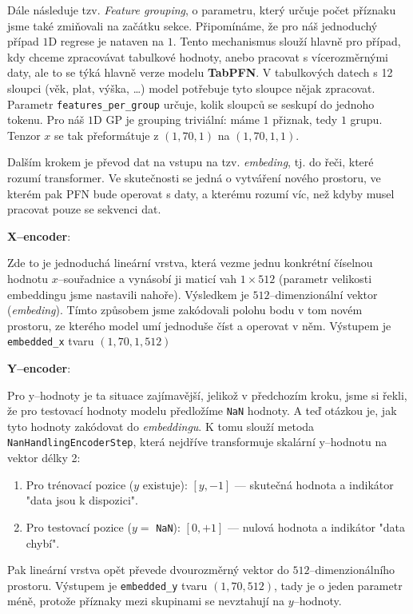 Dále následuje tzv. \textit{Feature grouping}, o parametru, který určuje počet příznaku jsme také zmiňovali na začátku sekce.
Připomínáme, že pro náš jednoduchý případ $1$D regrese je nataven na $1$.
Tento mechanismus slouží hlavně pro případ, kdy chceme zpracovávat tabulkové hodnoty, anebo pracovat s vícerozměrnými daty, ale to se týká hlavně verze modelu \textbf{TabPFN}.
V tabulkových datech s 12 sloupci (věk, plat, výška, \dots) model potřebuje tyto sloupce nějak zpracovat. 
Parametr \texttt{features\_per\_group} určuje, kolik sloupců se seskupí do jednoho tokenu.
Pro náš $1$D GP je grouping triviální: máme $1$ přiznak, tedy $1$ grupu. 
Tenzor $x$ se tak přeformátuje z $(1, 70, 1)$ na $(1, 70, 1, 1)$.
\par   

Dalším krokem je převod dat na vstupu na tzv. \textit{embeding}, tj. do řeči, které rozumí transformer. 
Ve skutečnosti se jedná o vytváření nového prostoru, ve kterém pak PFN bude operovat s daty, a kterému rozumí víc, než kdyby musel pracovat pouze se sekvenci dat.


\textbf{X–encoder}:

Zde to je jednoduchá lineární vrstva, která vezme jednu konkrétní číselnou hodnotu $x$–souřadnice a vynásobí ji maticí vah $1\times512$ (parametr velikosti embeddingu jsme nastavili nahoře).
Výsledkem je $512$–dimenzionální vektor (\textit{embeding}).
Tímto způsobem jsme zakódovali polohu bodu v tom novém prostoru, ze kterého model umí jednoduše číst a operovat v něm.
Výstupem je \texttt{embedded\_x} tvaru $(1, 70, 1, 512)$

\textbf{Y–encoder}:

Pro y–hodnoty je ta situace zajímavější, jelikož v předchozím kroku, jsme si řekli, že pro testovací hodnoty modelu předložíme \texttt{NaN} hodnoty. 
A teď otázkou je, jak tyto hodnoty zakódovat do \textit{embeddingu}.
K tomu slouží metoda \lstinline|NanHandlingEncoderStep|, která nejdříve transformuje skalární y–hodnotu na vektor délky 2:

\begin{enumerate}
    \item Pro trénovací pozice ($y$ existuje): $[y, -1]$ — skutečná hodnota a indikátor "data jsou k dispozici".
    \item Pro testovací pozice ($y =$ \texttt{NaN}): $[0, +1]$ — nulová hodnota a indikátor "data chybí". 
\end{enumerate}

Pak lineární vrstva opět převede dvourozměrný vektor do $512$–dimenzionálního prostoru.
Výstupem je \texttt{embedded\_y} tvaru $(1, 70, 512)$, tady je o jeden parametr méně, protože příznaky mezi skupinami se nevztahují na $y$–hodnoty.
\par   

